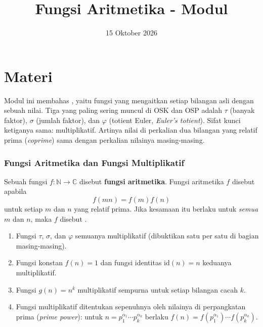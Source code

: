 \documentclass[12pt]{scrartcl}
\title{Fungsi Aritmetika - Modul}
\date{15 Oktober 2026}
\begin{document}
\maketitle

\renewcommand*\contentsname{Daftar Isi}
\tableofcontents

\newpage

\part*{Materi}

Modul ini membahas , yaitu fungsi
yang mengaitkan setiap bilangan asli dengan sebuah nilai. Tiga yang paling sering
muncul di OSK dan OSP adalah $\tau$ (banyak faktor), $\sigma$ (jumlah faktor),
dan $\varphi$ (totient Euler, \textit{Euler's totient}).
Sifat kunci ketiganya sama: multiplikatif. Artinya nilai di perkalian dua bilangan
yang relatif prima (\textit{coprime}) sama dengan perkalian nilainya masing-masing.

\section{Fungsi Aritmetika dan Fungsi Multiplikatif}

\begin{definition}
Sebuah fungsi $f : \mathbb{N} \to \mathbb{C}$ disebut \textbf{fungsi aritmetika}.
Fungsi aritmetika $f$ disebut  apabila
\[ f(mn) = f(m)f(n) \]
untuk setiap $m$ dan $n$ yang relatif prima. Jika kesamaan itu berlaku untuk
\emph{semua} $m$ dan $n$, maka $f$ disebut .
\end{definition}

\begin{fact}
\begin{enumerate}
    \item Fungsi $\tau$, $\sigma$, dan $\varphi$ semuanya multiplikatif
    (dibuktikan satu per satu di bagian masing-masing).
    \item Fungsi konstan $f(n) = 1$ dan fungsi identitas $\text{id}(n) = n$
    keduanya multiplikatif.
    \item Fungsi $g(n) = n^k$ multiplikatif sempurna untuk setiap bilangan cacah $k$.
    \item Fungsi multiplikatif ditentukan sepenuhnya oleh nilainya di perpangkatan
    prima (\textit{prime power}): untuk $n = p_1^{\alpha_1} \cdots p_k^{\alpha_k}$ berlaku
    $f(n) = f(p_1^{\alpha_1}) \cdots f(p_k^{\alpha_k})$.
\end{enumerate}
\end{fact}
\end{document}
